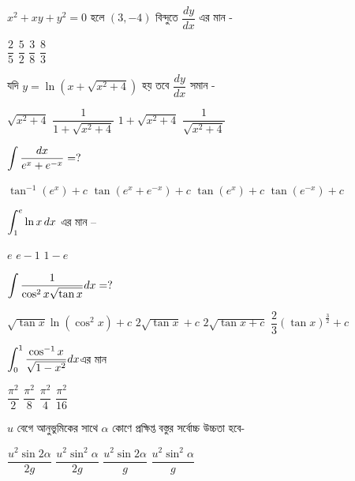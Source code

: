 \documentclass[addpoints]{exam}
\begin{document}
\begin{questions}
\question $ x^{2}+xy+ y^{2}=0  $ হলে $ (3,-4) $ বিন্দুতে $ \dfrac{dy}{dx} $ এর মান - 

\begin{oneparchoices}
\choice $ \dfrac{2}{5} $
\choice $ \dfrac{5}{2} $
\choice $ \dfrac{3}{8} $
\choice $ \dfrac{8}{3} $
\end{oneparchoices}

\question যদি $ y=\ln (x+\sqrt{x^{2}+4})  $ হয় তবে   $\dfrac{dy}{dx} $ সমান - 

\begin{oneparchoices}
\choice $ \sqrt{x^{2}+4} $
\choice $ \dfrac{1}{1+\sqrt{x^{2}+4}} $
\choice $ 1+\sqrt{x^{2}+4} $
\choice $ \dfrac{1}{\sqrt{x^{2}+4}} $
\end{oneparchoices}

\question $ \mathlarger{\int \dfrac{dx}{e^{x}+e^{-x}}=?} $

\begin{oneparchoices}
\choice $ \tan^{-1} (e^{x}) +c $
\choice $ \tan (e^{x}+e^{-x}) +c $
\choice $ \tan (e^{x}) +c $
\choice $ \tan (e^{-x}) +c$
\end{oneparchoices}

\question  $ \mathlarger{\int_{1}^{e}\ln x\, dx} $ এর  মান – 

\begin{oneparchoices}
\choice  $ e $
\choice  $ e-1 $
\choice  $ 1-e $
\end{oneparchoices}

\question  $ \mathlarger{\int\dfrac{1}{\cos^{2}x\sqrt{\tan x}} dx} =?$  

\begin{oneparchoices}
\choice  $ \sqrt{\tan x}\ln (\cos^{2}x)+c $
\choice  $ 2\sqrt{\tan x} +c $
\choice  $ 2\sqrt{\tan x +c}  $
\choice  $ \dfrac{2}{3}(\tan x)^{\frac{3}{2}} +c $
\end{oneparchoices}

\question  $ \mathlarger{\int_{0}^{1}\dfrac{\cos^{-1}x}{\sqrt{1-x^{2}}}dx} $এর মান

\begin{oneparchoices}
\choice $ \dfrac{\pi^{2}}{2} $
\choice $ \dfrac{\pi^{2}}{8} $
\choice $ \dfrac{\pi^{2}}{4} $
\choice $ \dfrac{\pi^{2}}{16} $

\end{oneparchoices}

\question  $ u $ বেগে আনুভুমিকের সাথে $ \alpha $ কোণে প্রক্ষিপ্ত বস্তুর সর্বোচ্চ উচ্চতা হবে-

\begin{oneparchoices}
\choice $ \dfrac{u^{2}\sin 2\alpha}{2g} $
\choice $ \dfrac{u^{2}\sin^{2}\alpha}{2g} $
\choice $ \dfrac{u^{2}\sin 2\alpha}{g} $
\choice $ \dfrac{u^{2}\sin^{2}\alpha}{g} $


\end{oneparchoices}
\end{questions}
\end{document}
